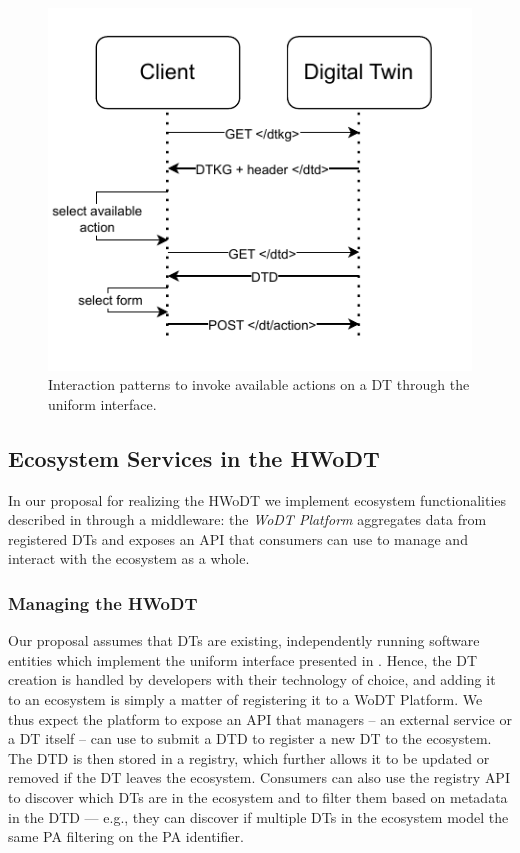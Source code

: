 \begin{figure}[t]
    \centering
    \includegraphics[width=0.7\columnwidth]{figures/hwodt/dtdactioncrop.pdf}
    \caption{Interaction patterns to invoke available actions on a \ac{DT} through the uniform interface.}
    \label{fig:sequence-action}
\end{figure}

\subsection{Ecosystem Services in the HWoDT}
\label{ssec:ecosystem-services}

In our proposal for realizing the \ac{HWoDT} we implement ecosystem functionalities described in  through a middleware:
%
the \emph{\ac{WoDT} Platform} aggregates data from registered \acp{DT} and exposes an \ac{API} that consumers can use to manage and interact with the ecosystem as a whole.

\subsubsection{Managing the \acl{HWoDT}}

Our proposal assumes that \acp{DT} are existing, independently running software entities which implement the uniform interface presented in .
%
Hence, the \ac{DT} creation is handled by developers with their technology of choice, and adding it to an ecosystem is simply a matter of registering it to a \ac{WoDT} Platform. 
%
We thus expect the platform to expose an \ac{API} that managers -- an external service or a \ac{DT} itself -- can use to submit a \ac{DTD} to register a new \ac{DT} to the ecosystem.
The \ac{DTD} is then stored in a registry, which further allows it to be updated or removed if the \ac{DT} leaves the ecosystem.
%
Consumers can also use the registry \ac{API} to discover which \acp{DT} are in the ecosystem and to filter them based on metadata in the \ac{DTD} --- e.g., they can discover if multiple \acp{DT} in the ecosystem model the same \ac{PA} filtering on the \ac{PA} identifier.

